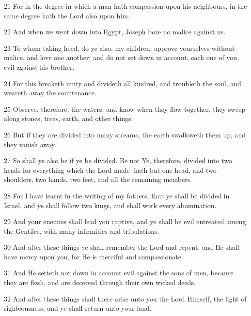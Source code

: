 \par 21 For in the degree in which a man hath compassion upon his neighbours, in the same degree hath the Lord also upon him.

\par 22 And when we went down into Egypt, Joseph bore no malice against us.

\par 23 To whom taking heed, do ye also, my children, approve yourselves without malice, and love one another; and do not set down in account, each one of you, evil against his brother.

\par 24 For this breaketh unity and divideth all kindred, and troubleth the soul, and weareth away the countenance.

\par 25 Observe, therefore, the waters, and know when they flow together, they sweep along stones, trees, earth, and other things.

\par 26 But if they are divided into many streams, the earth swalloweth them up, and they vanish away.

\par 27 So shall ye also be if ye be divided. Be not Ye, therefore, divided into two heads for everything which the Lord made .hath but one head, and two shoulders, two hands, two feet, and all the remaining members.

\par 28 For I have learnt in the writing of my fathers, that ye shall be divided in Israel, and ye shall follow two kings, and shall work every abomination.

\par 29 And your enemies shall lead you captive, and ye shall be evil entreated among the Gentiles, with many infirmities and tribulations.

\par 30 And after these things ye shall remember the Lord and repent, and He shall have mercy upon you, for He is merciful and compassionate.

\par 31 And He setteth not down in account evil against the sons of men, because they are flesh, and are deceived through their own wicked deeds.

\par 32 And after these things shall there arise unto you the Lord Himself, the light of righteousness, and ye shall return unto your land.

